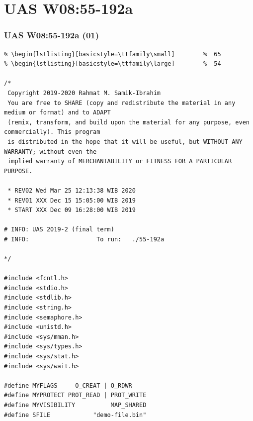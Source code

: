 \documentclass[aspectratio=169, xcolor=table, notheorems, hyperref={pdfpagelabels=false}]{beamer}
\begin{document}
\section{UAS W08:55-192a}
\begin{frame}[fragile]
\frametitle{UAS W08:55-192a (01)}
\begin{lstlisting}[basicstyle=\ttfamily\tiny]         % 108
% \begin{lstlisting}[basicstyle=\ttfamily\footnotesize] %  72
% \begin{lstlisting}[basicstyle=\ttfamily\small]        %  65
% \begin{lstlisting}[basicstyle=\ttfamily\large]        %  54

/*
 Copyright 2019-2020 Rahmat M. Samik-Ibrahim
 You are free to SHARE (copy and redistribute the material in any medium or format) and to ADAPT 
 (remix, transform, and build upon the material for any purpose, even commercially). This program
 is distributed in the hope that it will be useful, but WITHOUT ANY WARRANTY; without even the 
 implied warranty of MERCHANTABILITY or FITNESS FOR A PARTICULAR PURPOSE.

 * REV02 Wed Mar 25 12:13:38 WIB 2020
 * REV01 XXX Dec 15 15:05:00 WIB 2019
 * START XXX Dec 09 16:28:00 WIB 2019

# INFO: UAS 2019-2 (final term)
# INFO:                   To run:   ./55-192a 

*/

#include <fcntl.h>
#include <stdio.h>
#include <stdlib.h>
#include <string.h>
#include <semaphore.h>
#include <unistd.h>
#include <sys/mman.h>
#include <sys/types.h>
#include <sys/stat.h>
#include <sys/wait.h>

#define MYFLAGS     O_CREAT | O_RDWR
#define MYPROTECT PROT_READ | PROT_WRITE
#define MYVISIBILITY          MAP_SHARED
#define SFILE            "demo-file.bin"

\end{lstlisting}
\end{frame}
\end{document}
